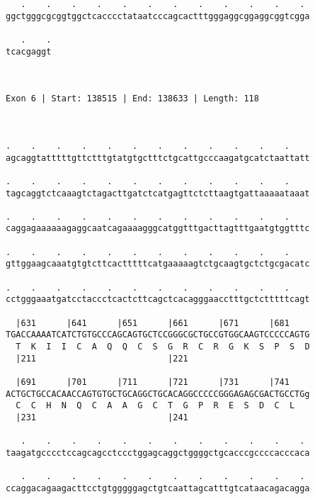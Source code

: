 \documentclass{article}
\begin{document}
\begin{Verbatim}
   .    .    .    .    .    .    .    .    .    .    .    . 
ggctgggcgcggtggctcacccctataatcccagcactttgggaggcggaggcggtcgga
                                                            
   .    .
tcacgaggt
         
         
 
Exon 6 | Start: 138515 | End: 138633 | Length: 118



.    .    .    .    .    .    .    .    .    .    .    .    
agcaggtatttttgttctttgtatgtgctttctgcattgcccaagatgcatctaattatt
                                                            
.    .    .    .    .    .    .    .    .    .    .    .    
tagcaggtctcaaagtctagacttgatctcatgagttctcttaagtgattaaaaataaat
                                                            
.    .    .    .    .    .    .    .    .    .    .    .    
caggagaaaaaagaggcaatcagaaaagggcatggtttgacttagtttgaatgtggtttc
                                                            
.    .    .    .    .    .    .    .    .    .    .    .    
gttggaagcaaatgtgtcttcactttttcatgaaaaagtctgcaagtgctctgcgacatc
                                                            
.    .    .    .    .    .    .    .    .    .    .    .    
cctgggaaatgatcctaccctcactcttcagctcacagggaacctttgctctttttcagt
                                                            
  |631      |641      |651      |661      |671      |681    
TGACCAAAATCATCTGTGCCCAGCAGTGCTCCGGGCGCTGCCGTGGCAAGTCCCCCAGTG
  T  K  I  I  C  A  Q  Q  C  S  G  R  C  R  G  K  S  P  S  D
  |211                          |221                        
  
  |691      |701      |711      |721      |731      |741    
ACTGCTGCCACAACCAGTGTGCTGCAGGCTGCACAGGCCCCCGGGAGAGCGACTGCCTGg
  C  C  H  N  Q  C  A  A  G  C  T  G  P  R  E  S  D  C  L   
  |231                          |241                        
  
   .    .    .    .    .    .    .    .    .    .    .    . 
taagatgcccctccagcagcctccctggagcaggctggggctgcacccgccccacccaca
                                                            
   .    .    .    .    .    .    .    .    .    .    .    . 
ccaggacagaagacttcctgtgggggagctgtcaattagcatttgtcataacagacagga
                                                            

\end{Verbatim}
\end{document}
